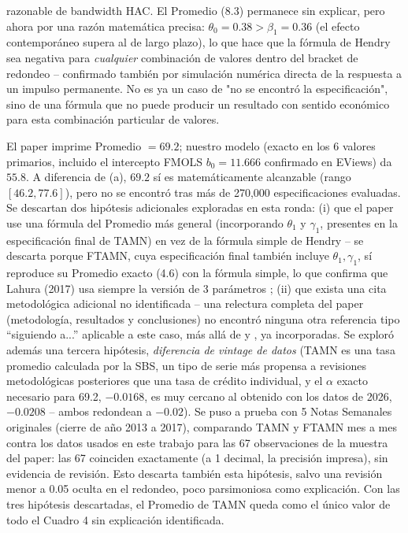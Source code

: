\documentclass[12pt, letterpaper]{article}
\begin{document}
\begin{table}[ht]
\begin{threeparttable}
\begin{tablenotes}[flushleft]
razonable de bandwidth HAC. El Promedio (8.3) permanece sin explicar,
pero ahora por una razón matemática precisa: $\theta_0=0.38 >
\beta_1=0.36$ (el efecto contemporáneo supera al de largo plazo), lo
que hace que la fórmula de Hendry sea negativa para \emph{cualquier}
combinación de valores dentro del bracket de redondeo -- confirmado
también por simulación numérica directa de la respuesta a un impulso
permanente. No es ya un caso de "no se encontró la especificación",
sino de una fórmula que no puede producir un resultado con sentido
económico para esta combinación particular de valores.
\item[c] El paper imprime Promedio $=69.2$; nuestro modelo (exacto en
los 6 valores primarios, incluido el intercepto FMOLS $b_0=11.666$
confirmado en EViews) da $55.8$. A diferencia de (a), $69.2$ sí es
matemáticamente alcanzable (rango $[46.2,77.6]$), pero no se encontró
tras más de 270,000 especificaciones evaluadas. Se descartan dos
hipótesis adicionales exploradas en esta ronda: (i) que el paper use
una fórmula del Promedio más general (incorporando $\theta_1$ y
$\gamma_1$, presentes en la especificación final de TAMN) en vez de
la fórmula simple de Hendry -- se descarta porque FTAMN, cuya
especificación final también incluye $\theta_1,\gamma_1$, sí reproduce
su Promedio exacto (4.6) con la fórmula simple, lo que confirma que
Lahura (2017) usa siempre la versión de 3 parámetros
\parencite{hendry1995}; (ii) que exista una cita metodológica
adicional no identificada -- una relectura completa del paper
(metodología, resultados y conclusiones) no encontró ninguna otra
referencia tipo ``siguiendo a...'' aplicable a este caso, más allá de
\textcite{hendry1995} y \textcite{juselius2006}, ya incorporadas. Se exploró además una
tercera hipótesis, \emph{diferencia de vintage de datos} (TAMN es una
tasa promedio calculada por la SBS, un tipo de serie más propensa a
revisiones metodológicas posteriores que una tasa de crédito
individual, y el $\alpha$ exacto necesario para 69.2, $-0.0168$, es muy
cercano al obtenido con los datos de 2026, $-0.0208$ -- ambos redondean
a $-0.02$). Se puso a prueba con 5 Notas Semanales originales (cierre
de año 2013 a 2017), comparando TAMN y FTAMN mes a mes contra los datos
usados en este trabajo para las 67 observaciones de la muestra del
paper: las 67 coinciden exactamente (a 1 decimal, la precisión
impresa), sin evidencia de revisión. Esto descarta también esta
hipótesis, salvo una revisión menor a 0.05 oculta en el redondeo, poco
parsimoniosa como explicación. Con las tres hipótesis descartadas, el
Promedio de TAMN queda como el único valor de todo el Cuadro 4 sin
explicación identificada.
\end{tablenotes}
\end{threeparttable}
\end{table}
\end{document}
